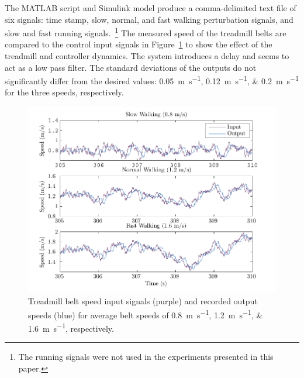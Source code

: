 \documentclass[fleqn,10pt]{wlpeerj}
\begin{document}
The MATLAB script and Simulink model produce a comma-delimited text file of six
signals: time stamp, slow, normal, and fast walking perturbation signals, and
slow and fast running signals.~\footnote{The running signals were not used in
the experiments presented in this paper.} The measured speed of the treadmill
belts are compared to the control input signals in
Figure~\ref{fig:input_output} to show the effect of the treadmill and
controller dynamics. The system introduces a delay and seems to act as a low
pass filter. The standard deviations of the outputs do not significantly differ
from the desired values: \SIlist{0.05;0.12;0.2}{\meter\per\second} for the
three speeds, respectively.
%
\begin{figure}
  \centering
  \includegraphics{figures/input_vs_output.pdf}
  \caption{Treadmill belt speed input signals (purple) and recorded output
    speeds (blue) for average belt speeds of
    \SIlist{0.8;1.2;1.6}{\meter\per\second}, respectively.}
  \label{fig:input_output}
\end{figure}
\end{document}
